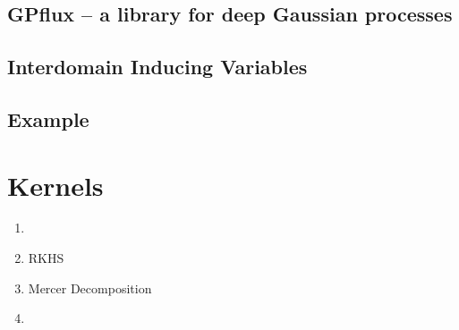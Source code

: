 \subsection{GPflux -- a library for deep Gaussian processes}


\subsection{Interdomain Inducing Variables}

\subsection{Example}

\section{Kernels}

\begin{enumerate}
  \item 
  \item RKHS
  \item Mercer Decomposition
  \item 
\end{enumerate}
